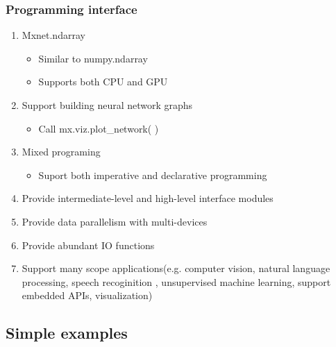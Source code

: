 \begin{frame}
  \MyLogo
  \frametitle{Programming interface}  

\begin{enumerate}
\item Mxnet.ndarray 
\begin{itemize}
\item Similar to numpy.ndarray
\item Supports both CPU and GPU
\end{itemize}

\item Support building neural network graphs
\begin{itemize}
\item Call mx.viz.plot\_network( )
\end{itemize}

\item Mixed programing
\begin{itemize}
\item Suport both imperative and declarative programming 
\end{itemize}
\item Provide intermediate-level and high-level interface modules

\item Provide data parallelism with multi-devices 
%
\item Provide abundant IO functions 
%
\item Support many scope applications(e.g. computer vision, natural language processing,  speech recoginition , unsupervised machine learning, support embedded APIs, visualization)

\end{enumerate}

\end{frame}

\subsection{Simple examples}

